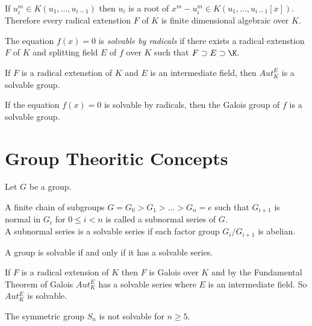 \begin{remark}
If \(u_i^m \in K(u_1,...,u_{i-1})\) then \(u_i\) is a root of \(x^m-u_i^m \in K(u_1,...,u_{i-1}[x])\). \\
Therefore every radical extenstion \(F\) of \(K\) is finite dimensional algebraic over \(K\).
\end{remark}

\begin{definition}
The equation \(f(x)=0\) is \textit{solvable by radicals} if there exists a radical extenstion \(F\) of \(K\) and splitting field \(E\) of \(f\) over \(K\) such that \(F \supset E \supset \K\).
\end{definition}

\begin{theorem}
If \(F\) is a radical extenstion of \(K\) and \(E\) is an intermediate field, then \(Aut_K^E\) is a solvable group.
\end{theorem}

\begin{corollary}
If the equation \(f(x)=0\) is solvable by radicals, then the Galois group of \(f\) is a solvable group.
\end{corollary}

\section{Group Theoritic Concepts}
Let \(G\) be a group. 

\begin{definition}
A finite chain of subgroups \(G=G_0>G_1>...>G_n={e}\) such that \(G_{i+1}\) is normal in \(G_i\) for \(0 \leq i < n\) is called a subnormal series of \(G\).\\
A subnormal series is a solvable series if each factor group \(G_i/G_{i+1}\) is abelian.
\end{definition}

\begin{definition}
A group is solvable if and only if it has a solvable series.
\end{definition}

If \(F\) is a radical extension of \(K\) then \(F\) is Galois over \(K\) and by the Fundamental Theorem of Galois \(Aut_K^E\) has a solvable series where \(E\) is an intermediate field. So \(Aut_K^E\) is solvable.

\begin{theorem}
The symmetric group \(S_n\) is not solvable for \(n \geq 5\).
\end{theorem}

